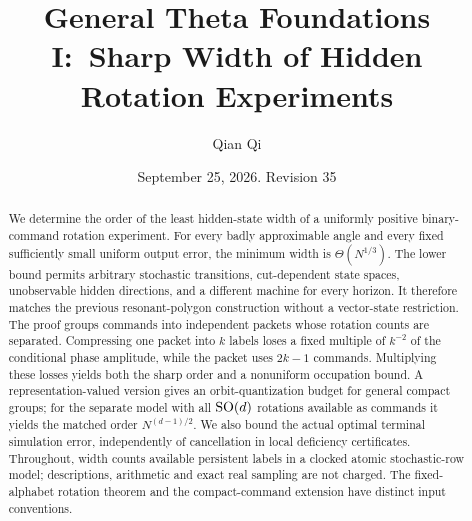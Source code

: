 \documentclass[11pt]{amsart}
\title[Sharp width of hidden rotation experiments]{General Theta Foundations I:\
Sharp Width of Hidden Rotation Experiments}
\author{Qian Qi}
\date{September 25, 2026. Revision 35}
\theoremstyle{definition}\newtheorem{definition}[theorem]{Definition}
\theoremstyle{remark}\newtheorem{remark}[theorem]{Remark}
\begin{document}
\begin{abstract}
We determine the order of the least hidden-state width of a uniformly
positive binary-command rotation experiment. For every badly approximable
angle and every fixed sufficiently small uniform output error, the minimum
width is $\Theta(N^{1/3})$. The lower bound permits arbitrary stochastic
transitions, cut-dependent state spaces, unobservable hidden directions,
and a different machine for every horizon. It therefore matches the
previous resonant-polygon construction without a vector-state restriction.
The proof groups commands into independent packets whose rotation counts
are separated. Compressing one packet into $k$ labels loses a fixed
multiple of $k^{-2}$ of the conditional phase amplitude, while the packet
uses $2k-1$ commands. Multiplying these losses yields both the sharp order
and a nonuniform occupation bound. A representation-valued version gives
an orbit-quantization budget for general compact groups; for the separate
model with all $\operatorname{SO}(d)$ rotations available as commands it yields the
matched order $N^{(d-1)/2}$. We also bound the actual optimal terminal
simulation error, independently of cancellation in local deficiency
certificates. Throughout, width counts available persistent labels in a
clocked atomic stochastic-row model; descriptions, arithmetic and exact
real sampling are not charged. The fixed-alphabet rotation theorem and
the compact-command extension have distinct input conventions.
\end{abstract}
\maketitle







\appendix


\end{document}
